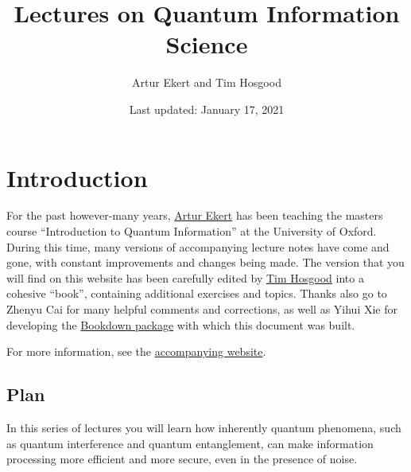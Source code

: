 \documentclass[fleqn]{article}
\title{Lectures on Quantum Information Science}
\author{Artur Ekert and Tim Hosgood}
\date{Last updated: January 17, 2021}
\renewcommand{\leq}{\leqslant}
\renewcommand{\geq}{\geqslant}
\let\oldsection\section
\renewcommand\section{\clearpage\oldsection}
\begin{document}
\setcounter{tocdepth}{2}
\tableofcontents

\providecommand{\xmapsto}[1]{\overset{#1}{\longmapsto}}
\providecommand{\bra}[1]{\langle#1|}
\providecommand{\ket}[1]{|#1\rangle}
\providecommand{\braket}[2]{\langle#1|#2\rangle}
\providecommand{\proj}[1]{|#1\rangle\langle#1|}
\providecommand{\av}[1]{\langle#1\rangle}
\providecommand{\tr}{\operatorname{tr}}
\providecommand{\id}{\mathbf{1}}
\providecommand{\diag}[2]{\begin{bmatrix}#1&0\\0&#2\end{bmatrix}}
\providecommand{\mqty}[1]{\begin{matrix}#1\end{matrix}}
\providecommand{\bmqty}[1]{\begin{bmatrix}#1\end{bmatrix}}
\renewcommand{\leq}{\leqslant}
\renewcommand{\geq}{\geqslant}

\hypertarget{introduction}{%
\section*{Introduction}\label{introduction}}

For the past however-many years, \href{https://www.arturekert.com/}{Artur Ekert} has been teaching the masters course ``Introduction to Quantum Information'' at the University of Oxford.
During this time, many versions of accompanying lecture notes have come and gone, with constant improvements and changes being made.
The version that you will find on this website has been carefully edited by \href{https://thosgood.com}{Tim Hosgood} into a cohesive ``book'', containing additional exercises and topics.
Thanks also go to Zhenyu Cai for many helpful comments and corrections, as well as Yihui Xie for developing the \href{https://bookdown.org/yihui/bookdown/}{Bookdown package} with which this document was built.

For more information, see the \href{https://thosgood.com/quantum-info}{accompanying website}.

\hypertarget{plan}{%
\subsection*{Plan}\label{plan}}

In this series of lectures you will learn how inherently quantum phenomena, such as quantum interference and quantum entanglement, can make information processing more efficient and more secure, even in the presence of noise.
\end{document}

